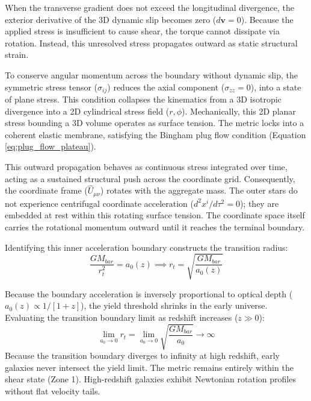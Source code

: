 When the transverse gradient does not exceed the longitudinal divergence, the exterior derivative of the 3D dynamic slip becomes zero ($d\mathbf{v} = 0$). Because the applied stress is insufficient to cause shear, the torque cannot dissipate via rotation. Instead, this unresolved stress propagates outward as static structural strain. 

To conserve angular momentum across the boundary without dynamic slip, the symmetric stress tensor ($\sigma_{ij}$) reduces the axial component ($\sigma_{zz} = 0$), into a state of plane stress. This condition collapses the kinematics from a 3D isotropic divergence into a 2D cylindrical stress field ($r, \phi$). Mechanically, this 2D planar stress bounding a 3D volume operates as surface tension. The metric locks into a coherent elastic membrane, satisfying the Bingham plug flow condition (Equation \ref{eq:plug_flow_plateau}). 

This outward propagation behaves as continuous stress integrated over time, acting as a sustained structural push across the coordinate grid. Consequently, the coordinate frame ($\hat{U}_{\mu\nu}$) rotates with the aggregate mass. The outer stars do not experience centrifugal coordinate acceleration ($d^2x^i/d\tau^2 = 0$); they are embedded at rest within this rotating surface tension. The coordinate space itself carries the rotational momentum outward until it reaches the terminal boundary. 

Identifying this inner acceleration boundary constructs the transition radius: 
\begin{equation}
    \frac{G M_{bar}}{r_t^2} = a_0(z) \implies r_t = \sqrt{\frac{G M_{bar}}{a_0(z)}} \label{eq:transition_radius_rt} %
\end{equation}

Because the boundary acceleration is inversely proportional to optical depth ($a_0(z) \propto 1/[1+z]$), the yield threshold shrinks in the early universe. Evaluating the transition boundary limit as redshift increases ($z \gg 0$):
\begin{equation}
    \lim_{a_0 \to 0} r_t = \lim_{a_0 \to 0} \sqrt{\frac{G M_{bar}}{a_0}} \to \infty
\end{equation}
Because the transition boundary diverges to infinity at high redshift, early galaxies never intersect the yield limit. The metric remains entirely within the shear state (Zone 1). High-redshift galaxies exhibit Newtonian rotation profiles without flat velocity tails. 

